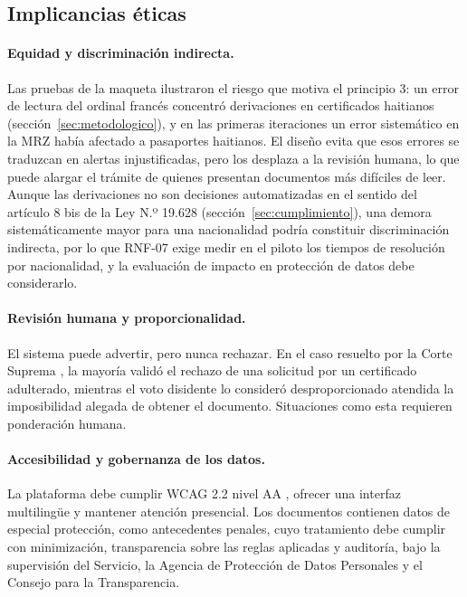 \documentclass[11pt,a4paper]{article}
\begin{document}
\subsection{Implicancias éticas}
\label{sec:etica}

\paragraph{Equidad y discriminación indirecta.} Las pruebas de la maqueta ilustraron el riesgo que motiva el principio 3: un error de lectura del ordinal francés concentró derivaciones en certificados haitianos (sección~\ref{sec:metodologico}), y en las primeras iteraciones un error sistemático en la MRZ había afectado a pasaportes haitianos. El diseño evita que esos errores se traduzcan en alertas injustificadas, pero los desplaza a la revisión humana, lo que puede alargar el trámite de quienes presentan documentos más difíciles de leer. Aunque las derivaciones no son decisiones automatizadas en el sentido del artículo 8 bis de la Ley N.º 19.628 (sección~\ref{sec:cumplimiento}), una demora sistemáticamente mayor para una nacionalidad podría constituir discriminación indirecta, por lo que RNF-07 exige medir en el piloto los tiempos de resolución por nacionalidad, y la evaluación de impacto en protección de datos debe considerarlo.

\paragraph{Revisión humana y proporcionalidad.} El sistema puede advertir, pero nunca rechazar. En el caso resuelto por la Corte Suprema \cite{cs2026}, la mayoría validó el rechazo de una solicitud por un certificado adulterado, mientras el voto disidente lo consideró desproporcionado atendida la imposibilidad alegada de obtener el documento. Situaciones como esta requieren ponderación humana.

\paragraph{Accesibilidad y gobernanza de los datos.} La plataforma debe cumplir WCAG 2.2 nivel AA \cite{wcag22}, ofrecer una interfaz multilingüe y mantener atención presencial. Los documentos contienen datos de especial protección, como antecedentes penales, cuyo tratamiento debe cumplir con minimización, transparencia sobre las reglas aplicadas y auditoría, bajo la supervisión del Servicio, la Agencia de Protección de Datos Personales y el Consejo para la Transparencia.
\end{document}
